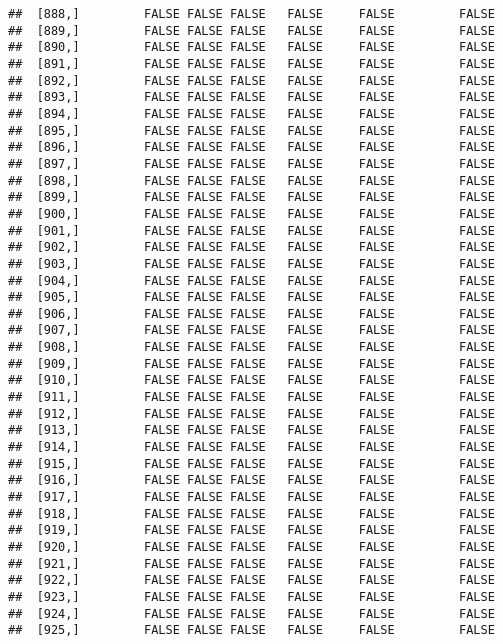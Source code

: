 \documentclass[
]{article}
\begin{document}
\begin{verbatim}
##  [888,]         FALSE FALSE FALSE   FALSE     FALSE         FALSE
##  [889,]         FALSE FALSE FALSE   FALSE     FALSE         FALSE
##  [890,]         FALSE FALSE FALSE   FALSE     FALSE         FALSE
##  [891,]         FALSE FALSE FALSE   FALSE     FALSE         FALSE
##  [892,]         FALSE FALSE FALSE   FALSE     FALSE         FALSE
##  [893,]         FALSE FALSE FALSE   FALSE     FALSE         FALSE
##  [894,]         FALSE FALSE FALSE   FALSE     FALSE         FALSE
##  [895,]         FALSE FALSE FALSE   FALSE     FALSE         FALSE
##  [896,]         FALSE FALSE FALSE   FALSE     FALSE         FALSE
##  [897,]         FALSE FALSE FALSE   FALSE     FALSE         FALSE
##  [898,]         FALSE FALSE FALSE   FALSE     FALSE         FALSE
##  [899,]         FALSE FALSE FALSE   FALSE     FALSE         FALSE
##  [900,]         FALSE FALSE FALSE   FALSE     FALSE         FALSE
##  [901,]         FALSE FALSE FALSE   FALSE     FALSE         FALSE
##  [902,]         FALSE FALSE FALSE   FALSE     FALSE         FALSE
##  [903,]         FALSE FALSE FALSE   FALSE     FALSE         FALSE
##  [904,]         FALSE FALSE FALSE   FALSE     FALSE         FALSE
##  [905,]         FALSE FALSE FALSE   FALSE     FALSE         FALSE
##  [906,]         FALSE FALSE FALSE   FALSE     FALSE         FALSE
##  [907,]         FALSE FALSE FALSE   FALSE     FALSE         FALSE
##  [908,]         FALSE FALSE FALSE   FALSE     FALSE         FALSE
##  [909,]         FALSE FALSE FALSE   FALSE     FALSE         FALSE
##  [910,]         FALSE FALSE FALSE   FALSE     FALSE         FALSE
##  [911,]         FALSE FALSE FALSE   FALSE     FALSE         FALSE
##  [912,]         FALSE FALSE FALSE   FALSE     FALSE         FALSE
##  [913,]         FALSE FALSE FALSE   FALSE     FALSE         FALSE
##  [914,]         FALSE FALSE FALSE   FALSE     FALSE         FALSE
##  [915,]         FALSE FALSE FALSE   FALSE     FALSE         FALSE
##  [916,]         FALSE FALSE FALSE   FALSE     FALSE         FALSE
##  [917,]         FALSE FALSE FALSE   FALSE     FALSE         FALSE
##  [918,]         FALSE FALSE FALSE   FALSE     FALSE         FALSE
##  [919,]         FALSE FALSE FALSE   FALSE     FALSE         FALSE
##  [920,]         FALSE FALSE FALSE   FALSE     FALSE         FALSE
##  [921,]         FALSE FALSE FALSE   FALSE     FALSE         FALSE
##  [922,]         FALSE FALSE FALSE   FALSE     FALSE         FALSE
##  [923,]         FALSE FALSE FALSE   FALSE     FALSE         FALSE
##  [924,]         FALSE FALSE FALSE   FALSE     FALSE         FALSE
##  [925,]         FALSE FALSE FALSE   FALSE     FALSE         FALSE

\end{verbatim}
\end{document}

